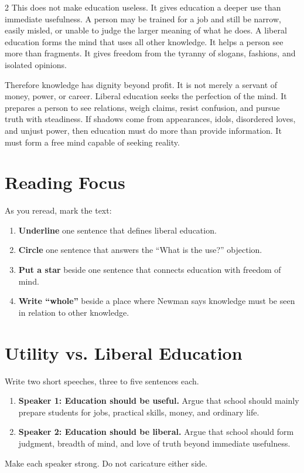 \documentclass[12pt]{article}
\begin{document}
\begin{multicols}{2}
This does not make education useless. It gives education a deeper use than immediate usefulness. A person may be trained for a job and still be narrow, easily misled, or unable to judge the larger meaning of what he does. A liberal education forms the mind that uses all other knowledge. It helps a person see more than fragments. It gives freedom from the tyranny of slogans, fashions, and isolated opinions.

Therefore knowledge has dignity beyond profit. It is not merely a servant of money, power, or career. Liberal education seeks the perfection of the mind. It prepares a person to see relations, weigh claims, resist confusion, and pursue truth with steadiness. If shadows come from appearances, idols, disordered loves, and unjust power, then education must do more than provide information. It must form a free mind capable of seeking reality.

\section*{Reading Focus}
As you reread, mark the text:
\begin{enumerate}[leftmargin=*]
\item \textbf{Underline} one sentence that defines liberal education.
\item \textbf{Circle} one sentence that answers the ``What is the use?'' objection.
\item \textbf{Put a star} beside one sentence that connects education with freedom of mind.
\item \textbf{Write ``whole''} beside a place where Newman says knowledge must be seen in relation to other knowledge.
\end{enumerate}

\section*{Utility vs. Liberal Education}
Write two short speeches, three to five sentences each.
\begin{enumerate}[leftmargin=*]
\item \textbf{Speaker 1: Education should be useful.} Argue that school should mainly prepare students for jobs, practical skills, money, and ordinary life.
\item \textbf{Speaker 2: Education should be liberal.} Argue that school should form judgment, breadth of mind, and love of truth beyond immediate usefulness.
\end{enumerate}
Make each speaker strong. Do not caricature either side.


\end{multicols}
\end{document}
